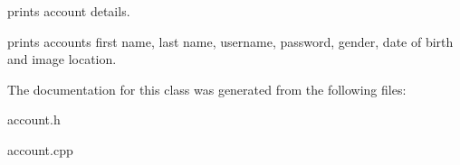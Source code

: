prints account details. 

prints account\textquotesingle{}s first name, last name, username, password, gender, date of birth and image location. 

The documentation for this class was generated from the following files\+:\begin{DoxyCompactItemize}
\item 
account.\+h\item 
account.\+cpp\end{DoxyCompactItemize}
